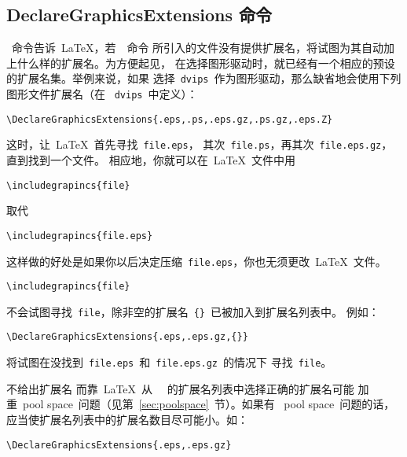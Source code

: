 \clearpage

\subsection{DeclareGraphicsExtensions 命令}\label{ssec:deextension}

~命令告诉~\LaTeX{}，若~~命令
所引入的文件没有提供扩展名，将试图为其自动加上什么样的扩展名。为方便起见，
在选择图形驱动时，就已经有一个相应的预设的扩展名集。举例来说，如果
选择~\texttt{dvips}~作为图形驱动，那么缺省地会使用下列图形文件扩展名（在
~\texttt{dvips}~中定义）：
\begin{Verbatim}[xleftmargin=1cm]
\DeclareGraphicsExtensions{.eps,.ps,.eps.gz,.ps.gz,.eps.Z}
\end{Verbatim}
这时，让~\LaTeX{}~首先寻找~\texttt{file.eps}，
其次~\texttt{file.ps}，再其次~\texttt{file.eps.gz}，直到找到一个文件。
相应地，你就可以在~\LaTeX{}~文件中用
\begin{Verbatim}[xleftmargin=1cm]
\includegrapincs{file}
\end{Verbatim}
取代
\begin{Verbatim}[xleftmargin=1cm]
\includegrapincs{file.eps}
\end{Verbatim}
这样做的好处是如果你以后决定压缩~\texttt{file.eps}，你也无须更改~\LaTeX{}~文件。

\begin{Verbatim}[xleftmargin=1cm]
\includegrapincs{file}
\end{Verbatim}
不会试图寻找~\texttt{file}，除非空的扩展名~\verb+{}+~已被加入到扩展名列表中。
例如：
\begin{Verbatim}[xleftmargin=1cm]
\DeclareGraphicsExtensions{.eps,.eps.gz,{}}
\end{Verbatim}
将试图在没找到~\texttt{file.eps}~和~\texttt{file.eps.gz}~的情况下
寻找~\texttt{file}。

不给出扩展名
而靠~\LaTeX~从
~~的扩展名列表中选择正确的扩展名可能
加重~pool space~问题（见第~\ref{sec:poolspace}~节）。如果有
~pool space~问题的话，应当使扩展名列表中的扩展名数目尽可能小。如：
\begin{Verbatim}[xleftmargin=1cm]
\DeclareGraphicsExtensions{.eps,.eps.gz}
\end{Verbatim}

